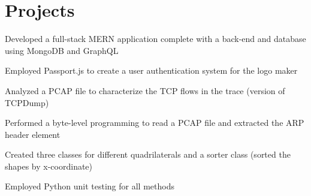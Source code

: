 \section{Projects}

\begin{tightemize}
\item Developed a full-stack MERN application complete with a back-end and database using MongoDB and GraphQL
\item Employed Passport.js to create a user authentication system for the logo maker
\end{tightemize}
\vspace{0.1 cm}

\begin{tightemize}
\item Analyzed a PCAP file to characterize the TCP flows in the trace (version of TCPDump)
\item Performed a byte-level programming to read a PCAP file and extracted the ARP header element
\end{tightemize}
\vspace{0.1 cm}

\begin{tightemize}
\item Created three classes for different quadrilaterals and a sorter class (sorted the shapes by x-coordinate)
\item Employed Python unit testing for all methods
\end{tightemize}
\vspace{0.1 cm}


